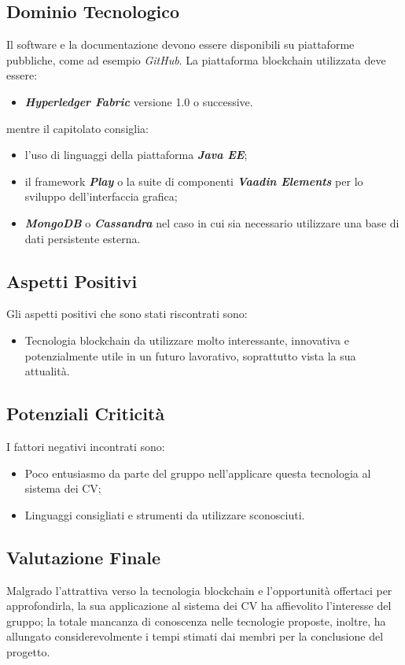\subsection{Dominio Tecnologico}
  Il software e la documentazione devono essere disponibili su piattaforme pubbliche, come ad esempio \textit{GitHub}{}.
  \newline \newline La piattaforma blockchain utilizzata deve essere:
    \begin{itemize}
      \item \textit{\textbf{Hyperledger Fabric}} versione 1.0 o successive.
    \end{itemize}
 mentre il capitolato consiglia:
     \begin{itemize}
       \item l'uso di linguaggi della piattaforma \textit{\textbf{Java EE}};
       \item il framework \textit{\textbf{Play}} o la suite di componenti \textit{\textbf{Vaadin Elements}} per lo sviluppo dell'interfaccia grafica;
       \item \textit{\textbf{MongoDB}} o \textit{\textbf{Cassandra}} nel caso in cui sia necessario utilizzare una base di dati persistente esterna.
     \end{itemize}
  
\subsection{Aspetti Positivi}
  Gli aspetti positivi che sono stati riscontrati sono:
  \begin{itemize}
    \item Tecnologia blockchain da utilizzare molto interessante, innovativa e potenzialmente utile in un futuro lavorativo,
    soprattutto vista la sua attualità.
  \end{itemize}

\subsection{Potenziali Criticità}
  I fattori negativi incontrati sono:
  \begin{itemize}
    \item Poco entusiasmo da parte del gruppo nell'applicare questa tecnologia al sistema dei CV;
    \item Linguaggi consigliati e strumenti da utilizzare sconosciuti.
  \end{itemize}
\subsection{Valutazione Finale}
  Malgrado l'attrattiva verso la tecnologia blockchain e l'opportunità offertaci per approfondirla, la sua applicazione al sistema dei CV ha affievolito l'interesse del gruppo; la totale mancanza di conoscenza nelle tecnologie proposte, inoltre, ha allungato considerevolmente i tempi stimati dai membri per la conclusione del progetto.
